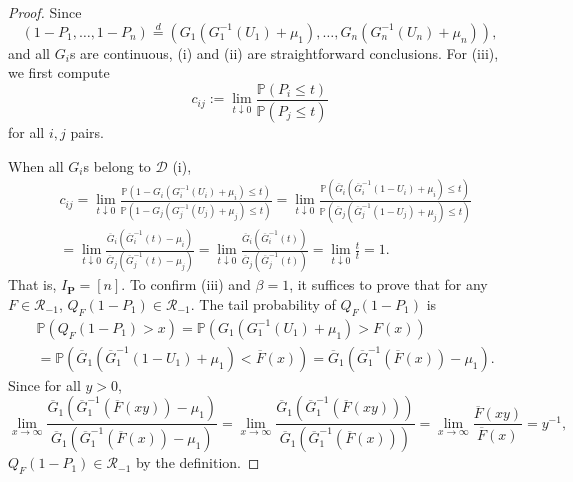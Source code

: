 \documentclass[12pt]{article}
\theoremstyle{plain}
\theoremstyle{plain}
\theoremstyle{definition}
\renewcommand{\Pr}{\mathbb{P}}
\begin{document}
\AlternativeA*
\begin{proof}
Since
\begin{equation*}
    (1-P_1,\dots,1-P_n) \overset{d}{=}(G_1(G^{-1}_1(U_1)+\mu_1),\dots, G_n(G^{-1}_n(U_n)+\mu_n)),
\end{equation*}
and all $G_i$s are continuous,  (i) and (ii) are straightforward conclusions. For (iii), we first compute
\[
c_{ij}:=\lim_{t\downarrow0}\frac{\Pr(P_i\le t)}{\Pr(P_j\le t)}
\]
for all $i, j$ pairs. 

When all $G_i$s belong to $\mathscr{D}$ (i),
\begin{align*}
&c_{ij} 
= \lim_{t\downarrow0}\frac{\Pr(1-G_i\left(G_i^{-1}(U_i)+\mu_i\right)\le t)}{\Pr(1-G_j\left(G_j^{-1}(U_j)+\mu_j\right)\le t)}
= \lim_{t\downarrow0}\frac{\Pr(\overline{G}_i\left(\overline{G}_i^{-1}(1-U_i)+\mu_i\right)\le t)}{\Pr(\overline{G}_j\left(\overline{G}_j^{-1}(1-U_j)+\mu_j\right)\le t)}\\
&=\lim_{t\downarrow0}\frac{\overline{G}_i\left(\overline{G}_i^{-1}(t)-\mu_i\right)}{\overline{G}_j\left(\overline{G}_j^{-1}(t)-\mu_j\right)}
=\lim_{t\downarrow0}\frac{\overline{G}_i\left(\overline{G}_i^{-1}(t)\right)}{\overline{G}_j\left(\overline{G}_j^{-1}(t)\right)}
=\lim_{t\downarrow0}\frac{t}{t}
=1.
\end{align*}
That is, $I_{\mathbf{P}}=[n]$. To confirm (iii) and $\beta=1$, it suffices to prove that for any $F\in\mathscr{R}_{-1}$, $Q_F(1-P_1)\in\mathscr{R}_{-1}$. The tail probability of $Q_F(1-P_1)$ is
\begin{align*}
&\Pr(Q_F(1-P_1)>x)
=\Pr\left(G_1(G^{-1}_1(U_1)+\mu_1)>F(x)\right)\\
&=\Pr\left(\overline{G}_1(\overline{G}^{-1}_1(1-U_1)+\mu_1)<\overline{F}(x)\right)
=\overline{G}_1\left(\overline{G}_1^{-1}(\overline{F}(x))-\mu_1\right).
\end{align*}
Since for all $y>0$,
\[
\lim_{x\to\infty}\frac{\overline{G}_1\left(\overline{G}_1^{-1}(\overline{F}(xy))-\mu_1\right)}{\overline{G}_1\left(\overline{G}_1^{-1}(\overline{F}(x))-\mu_1\right)}
=\lim_{x\to\infty}\frac{\overline{G}_1\left(\overline{G}_1^{-1}(\overline{F}(xy))\right)}{\overline{G}_1\left(\overline{G}_1^{-1}(\overline{F}(x))\right)}
=\lim_{x\to\infty}\frac{\overline{F}(xy)}{\overline{F}(x)}
=y^{-1},
\]
$Q_F(1-P_1)\in\mathscr{R}_{-1}$ by the definition.


\end{proof}
\end{document}
